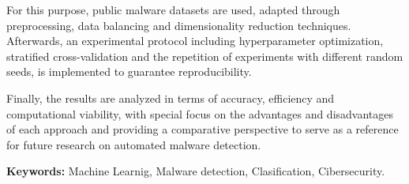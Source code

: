 \vspace{1em}

For this purpose, public malware datasets are used, adapted through preprocessing, data balancing and dimensionality reduction techniques. Afterwards, an experimental protocol including hyperparameter optimization, stratified cross-validation and the repetition of experiments with different random seeds, is implemented to guarantee reproducibility.

\vspace{1em}

Finally, the results are analyzed in terms of accuracy, efficiency and computational viability, with special focus on the advantages and disadvantages of each approach and providing a comparative perspective to serve as a reference for future research on automated malware detection.

\vspace{2em}

\textbf{Keywords:} Machine Learnig, Malware detection, Clasification, Cibersecurity.